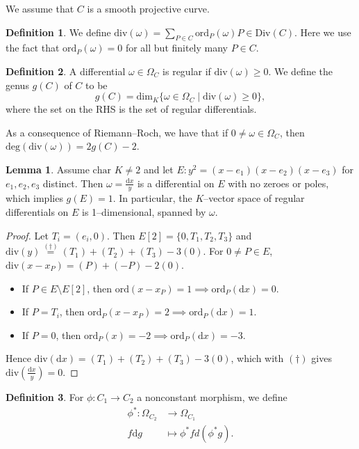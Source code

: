 \documentclass{article}
\theoremstyle{definition}
\newtheorem{lemma}[theorem]{Lemma}
\newtheorem{defn}{Definition}[section]
\begin{document}
We assume that $C$ is a smooth projective curve.
\begin{defn}
    We define $\text{div}(\omega) = \sum_{P \in C}^{} \text{ord}_P(\omega)P \in \text{Div}(C)$. Here we use the fact that $\text{ord}_P(\omega) = 0$ for all but finitely many $P \in C$.
\end{defn}
\begin{defn}
    A differential $\omega \in \Omega_C$ is regular if $\text{div}(\omega)\ge 0$. We define the genus $g(C)$ of $C$ to be \[
    g(C) = \text{dim}_K \{\omega \in \Omega_C \mid \text{div}(\omega)\ge 0\},
    \]
    where the set on the RHS is the set of regular differentials.
\end{defn}
As a consequence of Riemann--Roch, we have that if $0 \neq \omega \in \Omega_C$, then $\text{deg}(\text{div}(\omega)) = 2g(C)-2$.
\begin{lemma}
    Assume $\text{char }K \neq 2$ and let $E : y^2 = (x-e_1)(x-e_2)(x-e_3)$ for $e_1,e_2,e_3$ distinct. Then $\omega = \frac{\mathrm{d}x}{y}$ is a differential on $E$ with no zeroes or poles, which implies $g(E)=1$. In particular, the $K$--vector space of regular differentials on $E$ is 1--dimensional, spanned by $\omega$.
\end{lemma}
\begin{proof}
    Let $T_i = (e_i,0)$. Then $E[2]=\{0,T_1,T_2,T_3\}$ and $\text{div}(y) \stackrel{(\dagger)}{=} (T_1)+(T_2)+(T_3)-3(0)$. For $0 \neq P \in E$, $\text{div}(x-x_P) = (P)+(-P)-2(0)$. 
    \begin{itemize}
        \item If $P \in E\setminus E[2]$, then $\text{ord}(x-x_P)=1 \implies \text{ord}_P(\mathrm{d}x) = 0$.
        \item If $P = T_i$, then $\text{ord}_P(x-x_P) = 2 \implies \text{ord}_P(\mathrm{d}x)=1$. 
        \item If $P=0$, then $\text{ord}_P(x)= - 2 \implies \text{ord}_P(\mathrm{d}x) = -3$.
    \end{itemize}
    Hence $\text{div}(\mathrm{d}x) = (T_1)+(T_2)+(T_3) - 3(0)$, which with $(\dagger)$ gives $\text{div}\left(\frac{\mathrm{d}x}{y}\right) = 0$.
\end{proof}
\begin{defn}
    For $\phi : C_1 \to C_2$ a nonconstant morphism, we define 
    \begin{align*}
        \phi^* : \Omega_{C_2} &\to \Omega_{C_1}\\
        f \mathrm{d}g &\mapsto \phi^* f d(\phi^* g).
    \end{align*}
\end{defn}
\end{document}
